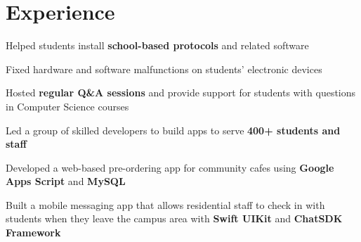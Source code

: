 \documentclass[]{main}
\begin{document}
\begin{minipage}[t]{0.66\textwidth}

\section{Experience}
\begin{tightemize}
\item Helped students install \textbf{school-based protocols} and related software
\item Fixed hardware and software malfunctions on students' electronic devices
\item Hosted \textbf{regular Q\&A sessions} and provide support for students with questions in Computer Science courses
\end{tightemize}
\sectionsep

\begin{tightemize}
\item Led a group of skilled developers to build apps to serve \textbf{400+ students and staff}
\item Developed a web-based pre-ordering app for community cafes using \textbf{Google Apps Script} and \textbf{MySQL}
\item Built a mobile messaging app that allows residential staff to check in with students when they leave the campus area with \textbf{Swift UIKit} and \textbf{ChatSDK Framework}
\end{tightemize}
\sectionsep



\end{minipage} 
\end{document}
